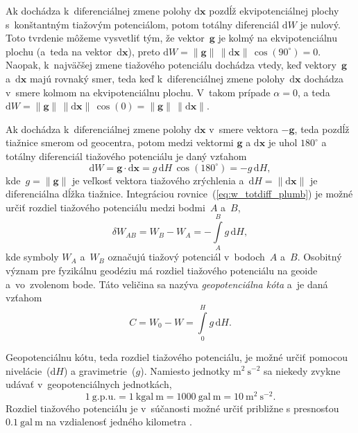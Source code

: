 \documentclass[a4paper,12pt]{book}
\newcommand{\diff}{\mathrm d}
\let\vec\mathbf
\begin{document}
Ak dochádza k~diferenciálnej zmene polohy $\diff \vec x$ pozdĺž 
ekvipotenciálnej plochy s~konštantným tiažovým potenciálom, potom totálny 
diferenciál $\diff W$ je nulový.  Toto tvrdenie môžeme vysvetliť tým, že 
vektor~$\vec g$ je kolmý na ekvipotenciálnu plochu (a~teda na vektor~$\diff 
\vec x$), preto $\diff W = \| \vec g \| \, \| \diff \vec x \| \, 
\cos(90^{\circ}) = 0$.  Naopak, k~najväčšej zmene tiažového potenciálu dochádza 
vtedy, keď vektory~$\vec g$ a~$\diff \vec x$ majú rovnaký smer, teda keď 
k~diferenciálnej zmene polohy~$\diff \vec x$ dochádza v~smere kolmom na 
ekvipotenciálnu plochu.  V~takom prípade $\alpha = 0$, a teda $\diff W = \| 
\vec g \| \, \| \diff \vec x \| \, \cos(0) = \| \vec g \| \, \| \diff \vec 
x \|$.

Ak dochádza k~diferenciálnej zmene polohy $\diff \vec x$ v~smere vektora $-\vec 
g$, teda pozdĺž tiažnice smerom od geocentra, potom medzi vektormi $\vec g$ 
a $\diff \vec x$ je uhol $180^{\circ}$ a totálny diferenciál tiažového 
potenciálu je daný vzťahom
%
\begin{equation}
\label{eq:w_totdiff_plumb}
\diff W = \vec g \cdot \diff \vec x = g \, \diff H \, \cos(180^{\circ}) = -g \, 
\diff H{,}
\end{equation}
%
kde~$g = \| \vec g \|$ je veľkosť vektora tiažového zrýchlenia a~$\diff H = \| 
\diff \vec x \|$ je diferenciálna dĺžka tiažnice.  Integráciou 
rovnice~(\ref{eq:w_totdiff_plumb}) je možné určiť rozdiel tiažového potenciálu 
medzi bodmi~$A$ a~$B$,
%
\begin{equation}
\label{eq:w_ab}
\delta W_{AB} = W_B - W_A = -\int\limits_{A}^{B} g \, \diff H{,}
\end{equation}
%
kde symboly $W_A$ a~$W_B$ označujú tiažový potenciál v~bodoch~$A$ a~$B$.  
Osobitný význam pre fyzikálnu geodéziu má rozdiel tiažového potenciálu na 
geoide a~vo~zvolenom bode.  Táto veličina sa nazýva \emph{geopotenciálna kóta} 
a~je daná vzťahom
%
\begin{equation}
\label{eq:geopotential_number}
C = W_0 - W = \int\limits_0^H g \, \diff H{.}
\end{equation}

Geopotenciálnu kótu, teda rozdiel tiažového potenciálu, je možné určiť pomocou 
nivelácie~($\diff H$) a gravimetrie~($g$).  Namiesto jednotky $\mathrm{m}^2\ 
\mathrm{s}^{-2}$ sa niekedy zvykne udávať v~geopotenciálnych jednotkách,
%
\begin{equation}
\label{eq:gpu_unit}
1\ \mathrm{g.p.u.} = 1\ \mathrm{kgal} \ \mathrm{m} = 1000\ \mathrm{gal}\ 
\mathrm{m} = 10\ \mathrm{m}^2 \ \mathrm{s}^{-2}{.}
\end{equation}
%
Rozdiel tiažového potenciálu je v~súčanosti možné určiť približne s presnosťou 
$0.1\ \mathrm{gal} \ \mathrm{m}$ na vzdialenosť jedného kilometra 
\parencite{MoritzPhysicalGeodesy}.
\end{document}
